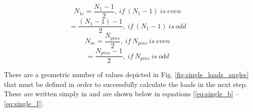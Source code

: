\begin{equation}
N_{1c} = \frac{N_{1} - 1}{2},\ if\ (N_1 -1)\ is\ even 
\end{equation}
\begin{equation}
= \frac{(N_{1}-1) - 1}{2},\ if\ (N_{1} - 1)\ is\ odd 
\end{equation}
\begin{equation}
N_{oc} = \frac{N_{pins}}{2},\ if\ N_{pins}\ is\ even 
\end{equation}
\begin{equation}
= \frac{N_{pins} - 1}{2},\ if\ N_{pins}\ is\ odd 
\end{equation}

There are a geometric number of values depicted in Fig. \ref{fig:single_loads_angles} that must be defined in order to successfully calculate the loads in the next step. These are written simply in \cite{ref:hwang_geometry} and are shown below in equations [\ref{eq:single_b} -- \ref{eq:single_l}]. 

